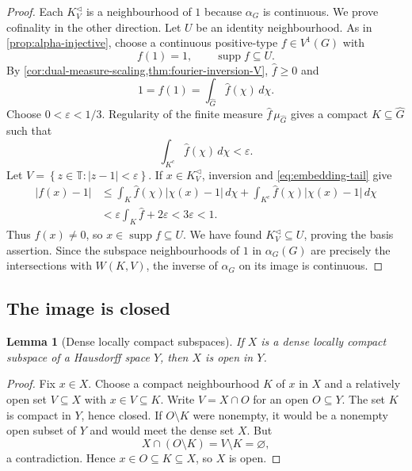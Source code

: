 \documentclass[11pt]{article}
\newtheorem{lemma}[theorem]{Lemma}
\theoremstyle{definition}
\theoremstyle{remark}
\newcommand{\T}{\mathbb T}
\newcommand{\supp}{\operatorname{supp}}
\newcommand{\dual}[1]{\widehat{#1}}
\newcommand{\abs}[1]{\lvert #1\rvert}
\newcommand{\set}[1]{\left\{#1\right\}}
\begin{document}
\begin{proof}
Each $K^{\triangleleft}_V$ is a neighbourhood of $1$ because $\alpha_G$ is continuous.
We prove cofinality in the other direction.  Let $U$ be an identity neighbourhood.
As in \cref{prop:alpha-injective}, choose a continuous positive-type
$f\in V^1(G)$ with
\[
  f(1)=1,\qquad \supp f\subseteq U.
\]
By \cref{cor:dual-measure-scaling,thm:fourier-inversion-V},
$\widehat f\geq0$ and
\[
  1=f(1)=\int_{\dual G}\widehat f(\chi)\,d\chi.
\]
Choose $0<\varepsilon<1/3$.  Regularity of the finite measure
$\widehat f\,\mu_{\dual G}$ gives a compact $K\subseteq\dual G$ such that
\begin{equation}
  \int_{K^c}\widehat f(\chi)\,d\chi<\varepsilon.
  \label{eq:embedding-tail}
\end{equation}
Let $V=\set{z\in\T:\abs{z-1}<\varepsilon}$.  If
$x\in K^{\triangleleft}_V$, inversion and \eqref{eq:embedding-tail} give
\begin{align*}
 \abs{f(x)-1}
 &\leq\int_K\widehat f(\chi)\abs{\chi(x)-1}\,d\chi
   +\int_{K^c}\widehat f(\chi)\abs{\chi(x)-1}\,d\chi\\
 &<\varepsilon\int_K\widehat f+2\varepsilon<3\varepsilon<1.
\end{align*}
Thus $f(x)\neq0$, so $x\in\supp f\subseteq U$.  We have found
$K^{\triangleleft}_V\subseteq U$, proving the basis assertion.  Since the subspace
neighbourhoods of $1$ in $\alpha_G(G)$ are precisely the intersections with
$W(K,V)$, the inverse of $\alpha_G$ on its image is continuous.
\end{proof}

\subsection{The image is closed}

\begin{lemma}[Dense locally compact subspaces]
\label{lem:dense-locally-compact-open}
If $X$ is a dense locally compact subspace of a Hausdorff space $Y$, then $X$ is open in
$Y$.
\end{lemma}

\begin{proof}
Fix $x\in X$.  Choose a compact neighbourhood $K$ of $x$ in $X$ and a relatively open
set $V\subseteq X$ with $x\in V\subseteq K$.  Write $V=X\cap O$ for an open
$O\subseteq Y$.  The set $K$ is compact in $Y$, hence closed.  If $O\setminus K$ were
nonempty, it would be a nonempty open subset of $Y$ and would meet the dense set $X$.
But
\[
  X\cap(O\setminus K)=V\setminus K=\varnothing,
\]
a contradiction.  Hence $x\in O\subseteq K\subseteq X$, so $X$ is open.
\end{proof}
\end{document}
